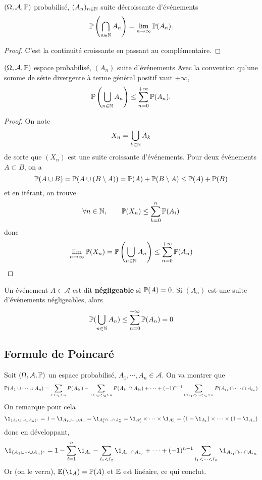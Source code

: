 \begin{thm}
    \Hyp $(\Omega, \mathcal A, \P)$ probabilisé, $(A_n)_{n\in \N}$ suite décroissante d'événements
    \Conc \[
        \P\left(\bigcap_{n\in \N}A_n \right)=\lim_{n \to \infty} \P(A_n).
    \]
\end{thm}

\begin{proof}
    C'est la continuité croissante en passant au complémentaire.
\end{proof}

\begin{thm}
    \Hyp $(\Omega, \mathcal A, \P)$ espace probabilisé, $(A_n)$ suite d'événements
    \Conc Avec la convention qu'une somme de série divergente à terme général positif vaut $+\infty$, \[
        \P\left( \bigcup_{n \in  \N}A_n  \right) \leq \sum_{n=0}^{+\infty} \P(A_n).
    \] 
\end{thm}

\begin{proof}
    On note \[
    X_n=\bigcup_{k\in \N}A_k 
    \] 
    de sorte que $(X_n)$ est une suite croissante d'événements. Pour deux événements $A\subset B$, on a \[
        \P(A\cup B)=\P(A\cup(B\setminus A))=\P(A)+\P(B\setminus A)\leq \P(A)+\P(B)
    \] 
    et en itérant, on trouve \[
        \forall n \in  \N, \qquad \P(X_n)\leq \sum_{k=0}^{n} \P(A_i)
    \] 
    donc \[
        \lim_{n \to \infty} \P(X_n) = \P\left( \bigcup_{n\in \N} A_n \right) \leq \sum_{n=0}^{+\infty} \P(A_n)
    \] 
\end{proof}

\begin{rem}
    Un événement $A\in \mathcal A$ est dit \textbf{négligeable} si $\P(A)=0$. Si $(A_n)$ est une suite d'événements négligeables, alors \[
        \P(\bigcup_{n\in \N}A_n )\leq \sum_{n=0}^{+\infty} \P(A_n)=0
    \] 
\end{rem}

\subsection{Formule de Poincaré}

Soit $(\Omega, \mathcal A, \P)$ un espace probabilisé, $A_1, \cdots, A_n \in  \mathcal A$. On va montrer que \[
    \P(A_1\cup \cdots \cup A_n)=\sum_{1\leq i_1\leq n}P(A_{i_1})-\sum_{1\leq i_1<i_2\leq n}P(A_{i_1}\cap A_{i_2}) +\cdots +(-1)^{n-1}\sum_{1\leq i_1<\cdots <i_n\leq n}P(A_{i_1}\cap \cdots \cap A_{i_n})
\] 
On remarque pour cela \[
    \1_{(A_1\cup \cdots \cup A_n)^c}=1-\1_{A_1\cup \cdots \cup A_n}=\1_{A_1^c\cap \cdots \cap A_n^c}=\1_{A_1^c}\times \cdots \times \1_{A_n^c}=(1-\1_{A_1})\times \cdots \times (1-\1_{A_n})
\]
donc en développant, \[
    \1_{(A_1\cup \cdots \cup A_n)^c} = 1-\sum_{i=1}^n\1_{A_i}-\sum_{i_1<i_2}\1_{A_{i_1}\cap A_{i_2}}+\cdots +(-1)^{n-1}\sum_{i_1<\cdots <i_n}\1_{A_{i_1}\cap\cdots\cap A_{i_n}}
\]
Or (on le verra), $\E(\1_A)=\P(A)$ et $\E$ est linéaire, ce qui conclut.

